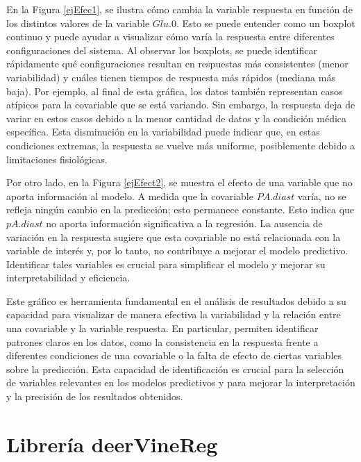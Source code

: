 En la Figura \ref{ejEfec1}, se ilustra cómo cambia la variable respuesta en función de los distintos valores de la variable $Glu.0$. Esto se puede entender como un boxplot continuo y puede ayudar a visualizar cómo varía la respuesta entre diferentes configuraciones del sistema. Al observar los boxplots, se puede identificar rápidamente qué configuraciones resultan en respuestas más consistentes (menor variabilidad) y cuáles tienen tiempos de respuesta más rápidos (mediana más baja). Por ejemplo, al final de esta gráfica, los datos también representan casos atípicos para la covariable que se está variando. Sin embargo, la respuesta deja de variar en estos casos debido a la menor cantidad de datos y la condición médica específica. Esta disminución en la variabilidad puede indicar que, en estas condiciones extremas, la respuesta se vuelve más uniforme, posiblemente debido a limitaciones fisiológicas.


Por otro lado, en la Figura \ref{ejEfect2}, se muestra el efecto de una variable que no aporta información al modelo. A medida que la covariable $PA.diast$ varía, no se refleja ningún cambio en la predicción; esto permanece constante. Esto indica que  $pA.diast$ no aporta información significativa a la regresión. La ausencia de variación en la respuesta sugiere que esta covariable no está relacionada con la variable de interés y, por lo tanto, no contribuye a mejorar el modelo predictivo. Identificar tales variables es crucial para simplificar el modelo y mejorar su interpretabilidad y eficiencia.


Este gráfico es herramienta fundamental en el análisis de resultados debido a su capacidad para visualizar de manera efectiva la variabilidad y la relación entre una covariable y la variable respuesta. En particular, permiten identificar patrones claros en los datos, como la consistencia en la respuesta frente a diferentes condiciones de una covariable o la falta de efecto de ciertas variables sobre la predicción. Esta capacidad de identificación es crucial para la selección de variables relevantes en los modelos predictivos y para mejorar la interpretación y la precisión de los resultados obtenidos. 


\section{Librería deerVineReg}

